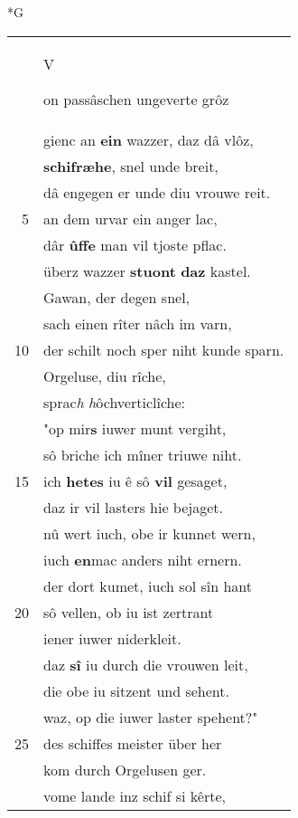 \documentclass[8pt,a4paper,notitlepage]{article}
\begin{document}
\newpage
\begin{table}[ht]
\begin{minipage}[t]{0.5\linewidth}
\small
\begin{center}*G
\end{center}
\begin{tabular}{rl}
 & \begin{large}V\end{large}on passâschen ungeverte grôz\\ 
 & gienc an \textbf{ein} wazzer, daz dâ vlôz,\\ 
 & \textbf{schifræhe}, snel unde breit,\\ 
 & dâ engegen er unde diu vrouwe reit.\\ 
5 & an dem urvar ein anger lac,\\ 
 & dâr \textbf{ûffe} man vil tjoste pflac.\\ 
 & überz wazzer \textbf{stuont} \textbf{daz} kastel.\\ 
 & Gawan, der degen snel,\\ 
 & sach einen rîter nâch im varn,\\ 
10 & der schilt noch sper niht kunde sparn.\\ 
 & Orgeluse, diu rîche,\\ 
 & sprac\textit{h} \textit{h}ôchverticlîche:\\ 
 & "op mir\textbf{s} iuwer munt vergiht,\\ 
 & sô briche ich mîner triuwe niht.\\ 
15 & ich \textbf{hete}\textbf{s} iu ê sô \textbf{vil} gesaget,\\ 
 & daz ir vil lasters hie bejaget.\\ 
 & nû wert iuch, obe ir kunnet wern,\\ 
 & iuch \textbf{en}mac anders niht ernern.\\ 
 & der dort kumet, iuch sol sîn hant\\ 
20 & sô vellen, ob iu ist zertrant\\ 
 & iener iuwer niderkleit.\\ 
 & daz \textbf{sî} iu durch die vrouwen leit,\\ 
 & die obe iu sitzent und sehent.\\ 
 & waz, op die iuwer laster spehent?"\\ 
25 & des schiffes meister über her\\ 
 & kom durch Orgelusen ger.\\ 
 & vome lande inz schif si kêrte,\\ 

\end{tabular}
\end{minipage}
\end{table}
\end{document}
